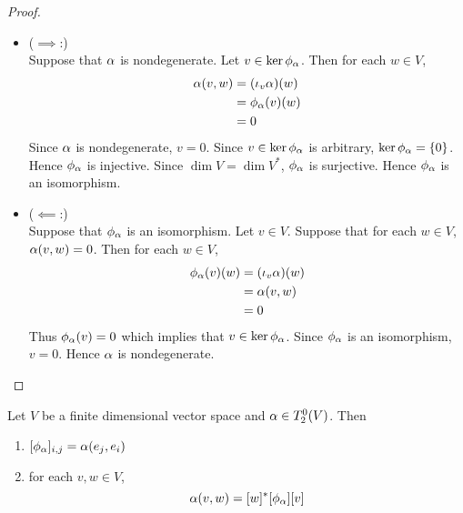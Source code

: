 \documentclass{book}
\begin{document}
	\begin{proof}\
		\begin{itemize}
			\item ($\implies$:) \\
			Suppose that $\alpha$ is nondegenerate. Let $v \in \ker \phi_{\alpha}$. Then for each $w \in V$,
			\begin{align*}
				\alpha(v, w) 
				& = (\iota_v \alpha) (w) \\
				& = \phi_{\alpha}(v)(w) \\
				& = 0 \\
			\end{align*}
			Since $\alpha$ is nondegenerate, $v = 0$. Since $v \in \ker \phi_{\alpha}$ is arbitrary, $\ker \phi_{\alpha} = \{0\}$. Hence $\phi_{\alpha}$ is injective. Since $\dim V = \dim V^*$, $\phi_{\alpha}$ is surjective. Hence $\phi_{\alpha}$ is an isomorphism.   
			\item ($\impliedby$:) \\
			Suppose that $\phi_{\alpha}$ is an isomorphism. Let $v \in V$. Suppose that for each $w \in V$, $\alpha(v, w) = 0$. Then for each $w \in V$,
			\begin{align*}
				\phi_{\alpha}(v)(w)
				& = (\iota_v \alpha) (w) \\
				& = \alpha(v, w) \\
				& = 0
			\end{align*}
			Thus $\phi_{\alpha}(v) = 0$ which implies that $v \in \ker \phi_{\alpha}$. Since $\phi_{\alpha}$ is an isomorphism, $v = 0$. Hence $\alpha$ is nondegenerate. 
		\end{itemize}
	\end{proof}

	\begin{ex}
		Let $V$ be a finite dimensional vector space and $\alpha \in T^0_2(V)$. Then
		\begin{enumerate}
			\item $[\phi_{\alpha}]_{i,j} = \alpha(e_j, e_i)$
			\item for each $v, w \in V$, 
			$$\alpha(v, w) = [w]^*[\phi_{\alpha}] [v]$$
		\end{enumerate}
	\end{ex}
	
\end{document}
